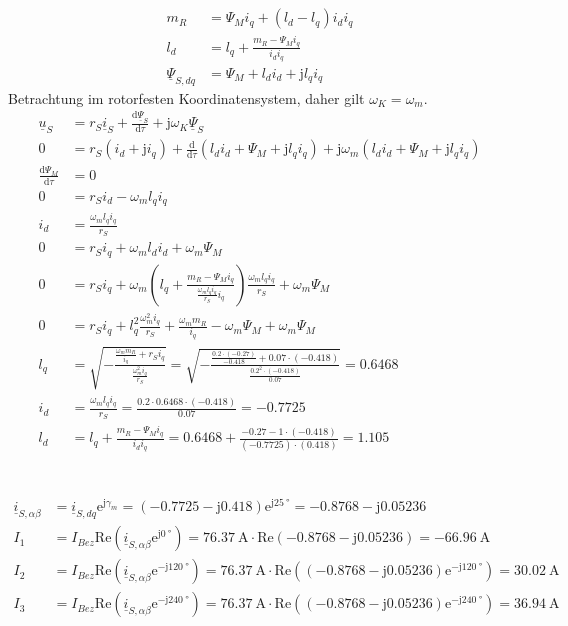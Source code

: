 \documentclass[11pt,a4paper]{scrartcl}
\newcommand{\mybr}[1]{\left(#1\right)}
\renewcommand{\j}{\mathrm{j}}
\renewcommand{\u}{\underline{u}}
\renewcommand{\i}{\underline{i}}
\newcommand{\PPsi}{\underline{\Psi}}
\newcommand{\0}{_{\mybr{0}}}
\newcommand{\1}{_{\mybr{1}}}
\newcommand{\2}{_{\mybr{2}}}
\renewcommand{\e}{\mathrm{e}}
\renewcommand{\d}{\mathrm{d}}
\renewcommand{\Re}{\mathrm{Re}}
\newcommand{\isab}{\i_{S,\alpha\beta}}
\newcommand{\isdq}{\i_{S,dq}}
\newcommand{\psdq}{\PPsi_{S,dq}}
\begin{document}
\section{}
\begin{align}
m_R&=\Psi_M i_q+\mybr{l_d-l_q}i_di_q\\
l_d&=l_q+\frac{m_R-\Psi_M i_q}{i_d i_q}\\
\psdq&=\Psi_M+l_d i_d+\j l_q i_q
\end{align}
Betrachtung im rotorfesten Koordinatensystem, daher gilt $\omega_K=\omega_m$.
\begin{align}
\u_S&=r_S\i_S+\frac{\d\PPsi_S}{\d\tau}+\j\omega_K\PPsi_S\\
0&=r_S\mybr{i_d+\j i_q}+\frac{\d}{\d\tau}\mybr{l_d i_d + \Psi_M + \j l_q i_q}+\j \omega_m \mybr{l_d i_d + \Psi_M + \j l_q i_q}\\
\frac{\d\Psi_M}{\d\tau}&=0\\
0&=r_S i_d -\omega_m l_q i_q\\
i_d&=\frac{\omega_m l_q i_q}{r_S}\\
0&=r_S i_q+\omega_m l_d i_d + \omega_m\Psi_M \\
0&= r_S i_q+\omega_m\mybr{l_q+\frac{m_R-\Psi_M i_q}{\frac{\omega_m l_q i_q}{r_S}i_q}}\frac{\omega_m l_q i_q}{r_S}+\omega_m \Psi_M\\
0&= r_S i_q+l_q^2\frac{\omega_m^2 i_q}{r_S}+\frac{\omega_m m_R}{i_q} -\omega_m\Psi_M +\omega_m \Psi_M\\
l_q&=\sqrt{-\frac{\frac{\omega_m m_R}{i_q}+r_S i_q}{\frac{\omega_m^2 i_q}{r_S}}}=\sqrt{-\frac{\frac{\num{0.2}\cdot\mybr{\num{-0.27}}}{\num{-0.418}}+\num{0.07}\cdot\mybr{\num{-0.418}}}{\frac{\num{0.2}^2\cdot\mybr{\num{-0.418}}}{\num{0.07}}}}=\num{0.6468}\\
i_d&=\frac{\omega_m l_q i_q}{r_S}=\frac{\num{0.2}\cdot\num{0.6468}\cdot\mybr{\num{-0.418}}}{\num{0.07}}=\num{-0.7725}\\
l_d&=l_q+\frac{m_R-\Psi_M i_q}{i_d i_q}=\num{0.6468}+\frac{\num{-0.27}-1\cdot\mybr{\num{-0.418}}}{\mybr{\num{-0.7725}}\cdot\mybr{\num{0.418}}}=\num{1.105}
\end{align}

\section{}
\begin{align}
\isab&=\isdq\e^{\j\gamma_m}=\mybr{\num{-0.7725}-\j\num{0.418}}\e^{\j\SI{25}{\degree}}=\num{-0.8768}-\j\num{0.05236}\\
I_1&=I_{Bez}\Re\mybr{\isab\e^{\j\SI{0}{\degree}}}=\SI{76.37}{\ampere}\cdot\Re\mybr{\num{-0.8768}-\j\num{0.05236}}=\SI{-66.96}{\ampere}\\
I_2&=I_{Bez}\Re\mybr{\isab\e^{-\j\SI{120}{\degree}}}=\SI{76.37}{\ampere}\cdot\Re\mybr{\mybr{\num{-0.8768}-\j\num{0.05236}}\e^{-\j\SI{120}{\degree}}}=\SI{30.02}{\ampere}\\	
I_3&=I_{Bez}\Re\mybr{\isab\e^{-\j\SI{240}{\degree}}}=\SI{76.37}{\ampere}\cdot\Re\mybr{\mybr{\num{-0.8768}-\j\num{0.05236}}\e^{-\j\SI{240}{\degree}}}=\SI{36.94}{\ampere}
\end{align}
\end{document}
